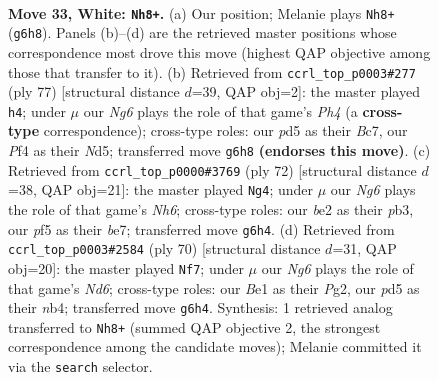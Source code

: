 \documentclass[11pt]{article}
\begin{document}
\clearpage

\begin{figure}[p]\centering
\begin{subfigure}{0.46\textwidth}\centering
\resizebox{\linewidth}{!}{%
\newchessgame
\chessboard[
  setfen={8/5k2/6N1/3p1p2/2pn1P2/1p6/1P2b3/1K2B2B w - - 2 33},
  showmover=false,
  pgfstyle=straightmove, color=movearrow, markmove={g6-h8}
]}
\caption{}
\end{subfigure}\hfill
\begin{subfigure}{0.46\textwidth}\centering
\resizebox{\linewidth}{!}{%
\newchessgame
\chessboard[
  setfen={8/2b2p2/2N1p1k1/3nP2p/3B4/5PP1/7P/5K2 b - - 6 39},
  showmover=false,
  pgfstyle=straightmove, color=movearrow, markmove={h5-h4}
]}
\caption{}
\end{subfigure}
\\[4pt]
\begin{subfigure}{0.46\textwidth}\centering
\resizebox{\linewidth}{!}{%
\newchessgame
\chessboard[
  setfen={8/4b3/6kN/3K2p1/7p/1p5P/1P1B2P1/n7 w - - 2 37},
  showmover=false,
  pgfstyle=straightmove, color=movearrow, markmove={h6-g4}
]}
\caption{}
\end{subfigure}\hfill
\begin{subfigure}{0.46\textwidth}\centering
\resizebox{\linewidth}{!}{%
\newchessgame
\chessboard[
  setfen={b5B1/7p/2pN2p1/2k5/1n3p1P/8/4KPP1/8 w - - 0 36},
  showmover=false,
  pgfstyle=straightmove, color=movearrow, markmove={d6-f7}
]}
\caption{}
\end{subfigure}
\caption{\textbf{Move 33, White: \texttt{Nh8+}.} (a) Our position; Melanie plays \texttt{Nh8+} (\texttt{g6h8}). Panels (b)--(d) are the retrieved master positions whose correspondence most drove this move (highest QAP objective among those that transfer to it). (b) Retrieved from \texttt{ccrl\_top\_p0003\#277} (ply 77) [structural distance $d$=39, QAP obj=2]: the master played \texttt{h4}; under $\mu$ our \emph{Ng6} plays the role of that game's \emph{Ph4} (a \textbf{cross-type} correspondence); cross-type roles: our \emph{p}d5 as their \emph{B}c7, our \emph{P}f4 as their \emph{N}d5; transferred move \texttt{g6h8} \textbf{(endorses this move)}. (c) Retrieved from \texttt{ccrl\_top\_p0000\#3769} (ply 72) [structural distance $d$=38, QAP obj=21]: the master played \texttt{Ng4}; under $\mu$ our \emph{Ng6} plays the role of that game's \emph{Nh6}; cross-type roles: our \emph{b}e2 as their \emph{p}b3, our \emph{p}f5 as their \emph{b}e7; transferred move \texttt{g6h4}. (d) Retrieved from \texttt{ccrl\_top\_p0003\#2584} (ply 70) [structural distance $d$=31, QAP obj=20]: the master played \texttt{Nf7}; under $\mu$ our \emph{Ng6} plays the role of that game's \emph{Nd6}; cross-type roles: our \emph{B}e1 as their \emph{P}g2, our \emph{p}d5 as their \emph{n}b4; transferred move \texttt{g6h4}. Synthesis: 1 retrieved analog transferred to \texttt{Nh8+} (summed QAP objective 2, the strongest correspondence among the candidate moves); Melanie committed it via the \texttt{search} selector.}
\label{fig:thought-m64}
\end{figure}
\end{document}
